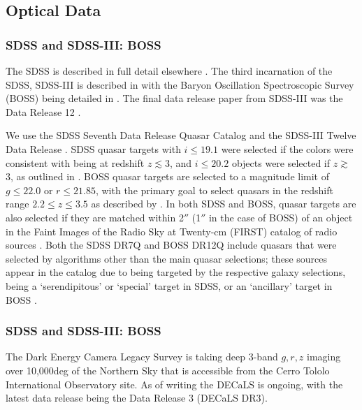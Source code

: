 \documentclass{emulateapj}
\begin{document}
\subsection{Optical Data}
    \subsubsection{SDSS and SDSS-III: BOSS}
    The SDSS is described in full detail elsewhere \citep{Fukugita96,
      Gunn98, York00, Hogg01, Lupton01, Stoughton02, Smith02, Pier03,
      Ivezic04, Gunn06, Tucker06, Padmanabhan08a}. The third incarnation of
    the SDSS, SDSS-III is described in \citet{Eisenstein11} with the
    Baryon Oscillation Spectroscopic Survey (BOSS) being detailed in
    \citet{Dawson13}. The final data release paper from SDSS-III was the
    Data Release 12 \citep{DR12}.
    
    We use the SDSS Seventh Data Release Quasar Catalog
    \citep[DR7Q;][]{Schneider10, Shen11} and the SDSS-III Twelve Data
    Release \citep[DR12Q;][]{Paris16}. SDSS quasar targets with
    $i\leq19.1$ were selected if the colors were consistent with being at
    redshift $z\lesssim3$, and $i\leq20.2$ objects were selected if
    $z\gtrsim$3, as outlined in \citet{Richards02}. BOSS quasar targets
    are selected to a magnitude limit of $g \leq 22.0$ or $r\leq 21.85$,
    with the primary goal to select quasars in the redshift range $2.2\leq
    z \leq 3.5$ as described by \citet[][and references
    therein]{Ross12}. In both SDSS and BOSS, quasar targets are also
    selected if they are matched within 2$''$ (1$''$ in the case of BOSS)
    of an object in the Faint Images of the Radio Sky at Twenty-cm (FIRST)
    catalog of radio sources \citep{Becker95}. Both the SDSS DR7Q and
    BOSS DR12Q include quasars that were selected by algorithms other than
    the main quasar selections; these sources appear in the catalog due
    to being targeted by the respective galaxy selections, being a
    `serendipitous' \citep{Stoughton02} or `special' \citep{DR4} target in
    SDSS, or an `ancillary' target in BOSS \citep[][]{Dawson13, DR12, DR14}.
    
    \subsubsection{SDSS and SDSS-III: BOSS}
    The Dark Energy Camera Legacy Survey \citep[DECaLS; ][]{Lang16} is
    taking deep 3-band $g,r,z$ imaging over 10,000deg of the Northern Sky
    that is accessible from the Cerro Tololo International Observatory
    site. As of writing the DECaLS is ongoing, with the latest data release being
    the Data Release 3 (DECaLS DR3). 
    
\end{document}
